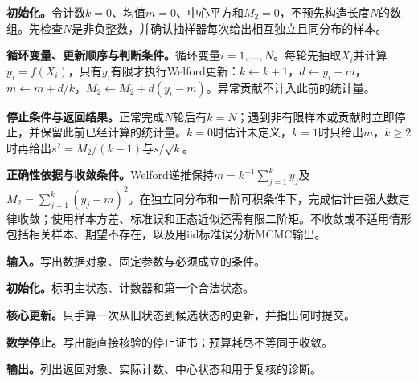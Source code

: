 \label{struct:V5-C02-CH22}
\textbf{初始化。}令计数$k=0$、均值$m=0$、中心平方和$M_2=0$，不预先构造长度$N$的数组。先检查$N$是非负整数，并确认抽样器每次给出相互独立且同分布的样本。

\label{struct:V5-C02-CH23}
\textbf{循环变量、更新顺序与判断条件。}循环变量$i=1,\ldots,N$。每轮先抽取$X_i$并计算$y_i=f(X_i)$，只有$y_i$有限才执行Welford更新：$k\leftarrow k+1$，$d\leftarrow y_i-m$，$m\leftarrow m+d/k$，$M_2\leftarrow M_2+d(y_i-m)$。异常贡献不计入此前的统计量。

\label{struct:V5-C02-CH24}
\textbf{停止条件与返回结果。}正常完成$N$轮后有$k=N$；遇到非有限样本或贡献时立即停止，并保留此前已经计算的统计量。$k=0$时估计未定义，$k=1$时只给出$m$，$k\ge2$时再给出$s^2=M_2/(k-1)$与$s/\sqrt{k}$。

\label{struct:V5-C02-CH25}
\textbf{正确性依据与收敛条件。}Welford递推保持$m=k^{-1}\sum_{j=1}^ky_j$及$M_2=\sum_{j=1}^k(y_j-m)^2$。在独立同分布和一阶可积条件下，完成估计由强大数定律收敛；使用样本方差、标准误和正态近似还需有限二阶矩。不收敛或不适用情形包括相关样本、期望不存在，以及用iid标准误分析MCMC输出。

\begingroup
{}

\begin{keypointbox}[title={独立蒙特卡罗均值与Welford在线诊断：五步阅读}]
\textbf{输入。}写出数据对象、固定参数与必须成立的条件。\par
\textbf{初始化。}标明主状态、计数器和第一个合法状态。\par
\textbf{核心更新。}只手算一次从旧状态到候选状态的更新，并指出何时提交。\par
\textbf{数学停止。}写出能直接核验的停止证书；预算耗尽不等同于收敛。\par
\textbf{输出。}列出返回对象、实际计数、中心状态和用于复核的诊断。
\end{keypointbox}

